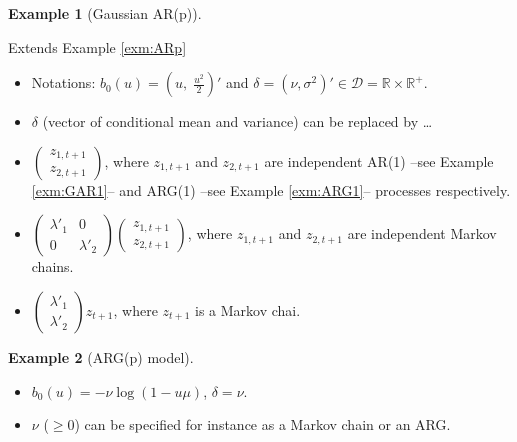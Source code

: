 \documentclass[
  12pt,
]{book}
\providecommand{\tightlist}{%
  \setlength{\itemsep}{0pt}\setlength{\parskip}{0pt}}
\theoremstyle{definition}
\theoremstyle{definition}
\newtheorem{example}{Example}[chapter]
\theoremstyle{definition}
\theoremstyle{definition}
\theoremstyle{remark}
\begin{document}
\begin{example}[Gaussian AR(p)]
\protect\hypertarget{exm:extendedARp}{}\label{exm:extendedARp}

Extends Example \ref{exm:ARp}

\begin{itemize}
\item
  Notations: \(b_0(u) = \left(u, \; \frac{u^2}{2}\right)'\) and \(\delta = (\nu,\sigma^2)' \in \mathcal{D}=\mathbb{R} \times \mathbb{R}^+\).
\item
  \(\delta\) (vector of conditional mean and variance) can be replaced by \ldots{}
\item
  \(\left( \begin{array}{l} z_{1,t+1} \\ z_{2,t+1} \end{array} \right)\), where \(z_{1,t+1}\) and \(z_{2,t+1}\) are independent AR(1) --see Example \ref{exm:GAR1}-- and
  ARG(1) --see Example \ref{exm:ARG1}-- processes respectively.
\item
  \(\left( \begin{array}{ll} \lambda'_1 & 0 \\ 0 & \lambda'_2 \end{array} \right)\)\(\left( \begin{array}{l} z_{1,t+1} \\ z_{2,t+1} \end{array} \right)\), where \(z_{1,t+1}\) and \(z_{2,t+1}\) are
  independent Markov
  chains.
\item
  \(\left( \begin{array}{l} \lambda'_1 \\ \lambda'_2 \end{array}\right)z_{t+1}\), where \(z_{t+1}\) is a Markov chai.
\end{itemize}

\end{example}

\begin{example}[ARG(p) model]
\protect\hypertarget{exm:ARGp}{}\label{exm:ARGp}\leavevmode

\begin{itemize}
\tightlist
\item
  \(b_0(u)= - \nu \log(1-u\mu)\), \(\delta=\nu\).
\item
  \(\nu\) (\(\ge 0\)) can be specified for instance as a Markov chain or an ARG.
\end{itemize}

\end{example}
\end{document}

